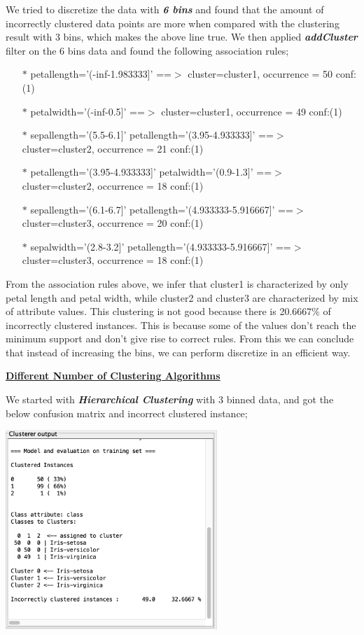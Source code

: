 \documentclass[a4paper,10pt]{article}
\begin{document}
We tried to discretize the data with \textbf{\textit{6 bins}} and found that the amount of incorrectly clustered
data points are more when compared with the clustering result with 3 bins, which makes the above line true. We then
applied \textbf{\textit{addCluster}} filter on the 6 bins data and found the following association rules;
\begin{enumerate}
  \item [$*$] petallength='(-inf-1.983333]' ==$>$ cluster=cluster1, occurrence = 50    conf:(1)
  \item [$*$] petalwidth='(-inf-0.5]' ==$>$ cluster=cluster1, occurrence = 49    conf:(1)
  \item [$*$] sepallength='(5.5-6.1]' petallength='(3.95-4.933333]' ==$>$ cluster=cluster2, occurrence = 21    conf:(1)
  \item [$*$] petallength='(3.95-4.933333]' petalwidth='(0.9-1.3]' ==$>$ cluster=cluster2, occurrence = 18    conf:(1)
  \item [$*$] sepallength='(6.1-6.7]' petallength='(4.933333-5.916667]' ==$>$ cluster=cluster3, occurrence = 20    conf:(1)
  \item [$*$] sepalwidth='(2.8-3.2]' petallength='(4.933333-5.916667]' ==$>$ cluster=cluster3, occurrence = 18    conf:(1)
\end{enumerate}
From the association rules above, we infer that cluster1 is characterized by only petal length and petal width, while
cluster2 and cluster3 are characterized by mix of attribute values. This clustering is not good because there is 20.6667\% 
of incorrectly clustered instances. This is because some of the values don't reach the minimum support and don't
give rise to correct rules. From this we can conclude that instead of increasing the bins, we can perform discretize
in an efficient way.
\par
\textbf{\underline{Different Number of Clustering Algorithms}} \par
We started with \textbf{\textit{Hierarchical Clustering}} with 3 binned data, and got the below confusion matrix and 
incorrect clustered instance;
\begin{center}
  \includegraphics[width=80mm,scale=0.10]{Hierarchical_Clustering.png}
\end{center}
\end{document}
